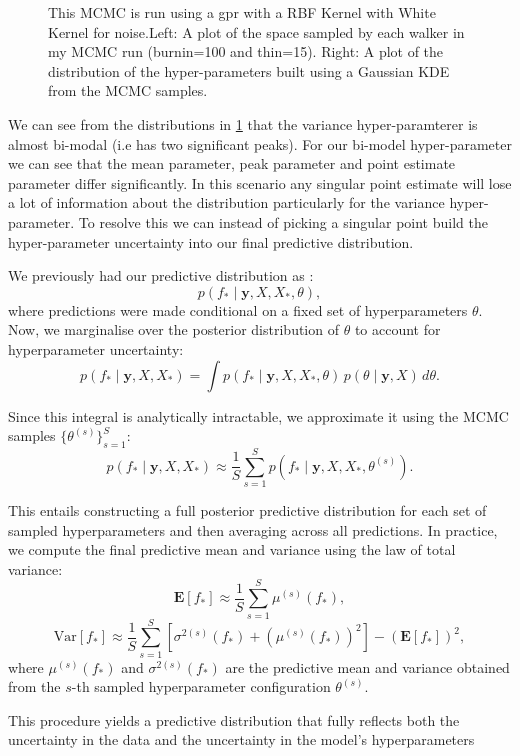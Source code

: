 \documentclass[11pt]{article}
\begin{document}
\begin{figure}[H]
\begin{subfigure}[b]{0.48\textwidth}
    \end{subfigure}
    \caption{This MCMC is run using a gpr with a RBF Kernel with White Kernel for noise.Left: A plot of the space sampled by each walker in my MCMC run (burnin=100 and thin=15). \quad Right: A plot of the distribution of the hyper-parameters built using a Gaussian KDE from the MCMC samples.}
    \label{fig:MCMCresults}
\end{figure}
\noindent
We can see from the distributions in \ref{fig:MCMCresults} that the variance hyper-paramterer is almost bi-modal (i.e has two significant peaks). For our bi-model hyper-parameter we can see that the mean parameter, peak parameter and point estimate parameter differ significantly.
In this scenario any singular point estimate will lose a lot of information about the distribution particularly for the variance hyper-parameter. To resolve this we can instead of picking a singular point build
the hyper-parameter uncertainty into our final predictive distribution.


\noindent
We previously had our predictive distribution as :
\[
p(f_* \mid \mathbf{y}, X, X_*, \theta),
\]
where predictions were made conditional on a fixed set of hyperparameters \( \theta \). Now, we marginalise over the posterior distribution of \( \theta \) to account for hyperparameter uncertainty:
\[
p(f_* \mid \mathbf{y}, X, X_*) = \int p(f_* \mid \mathbf{y}, X, X_*, \theta) \, p(\theta \mid \mathbf{y}, X) \, d\theta.
\]

\noindent
Since this integral is analytically intractable, we approximate it using the MCMC samples \( \{\theta^{(s)}\}_{s=1}^S \):
\[
p(f_* \mid \mathbf{y}, X, X_*) \approx \frac{1}{S} \sum_{s=1}^{S} p(f_* \mid \mathbf{y}, X, X_*, \theta^{(s)}).
\]

\noindent
This entails constructing a full posterior predictive distribution for each set of sampled hyperparameters and then averaging across all predictions. In practice, we compute the final predictive mean and variance using the law of total variance:
\[
\mathbf{E}[f_*] \approx \frac{1}{S} \sum_{s=1}^{S} \mu^{(s)}(f_*),
\]
\[
\text{Var}[f_*] \approx \frac{1}{S} \sum_{s=1}^{S} \left[ \sigma^{2(s)}(f_*) + \left(\mu^{(s)}(f_*)\right)^2 \right] - \left( \mathbf{E}[f_*] \right)^2,
\]
where \( \mu^{(s)}(f_*) \) and \( \sigma^{2(s)}(f_*) \) are the predictive mean and variance obtained from the \( s \)-th sampled hyperparameter configuration \( \theta^{(s)} \).


\noindent
This procedure yields a predictive distribution that fully reflects both the uncertainty in the data and the uncertainty in the model's hyperparameters
\end{document}
